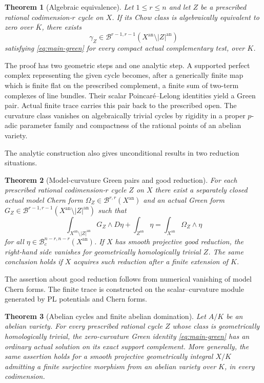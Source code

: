 \documentclass[11pt,reqno]{amsart}
\newtheorem{theorem}{Theorem}[section]
\theoremstyle{definition}
\theoremstyle{remark}
\numberwithin{equation}{section}
\newcommand{\an}{\mathrm{an}}
\newcommand{\B}{\mathcal B}
\begin{document}
\begin{theorem}[Algebraic equivalence]\label{thm:main-algebraic}
Let $1\le r\le n$ and let $Z$ be a prescribed rational
codimension-$r$ cycle on $X$.
If its Chow class is algebraically equivalent to zero over
$\overline K$, there exists
\[
\gamma_Z\in\B^{r-1,r-1}
       (X^{\an}\setminus |Z|^{\an})
\]
satisfying \eqref{eq:main-green} for every compact actual
complementary test, over $K$.
\end{theorem}

The proof has two geometric steps and one analytic step.
A supported perfect complex representing the given cycle becomes,
after a generically finite map which is finite flat on the prescribed
complement, a finite sum of two-term complexes of line bundles.
Their scalar Poincar\'e--Lelong identities yield a Green pair.
Actual finite trace carries this pair back to the prescribed open.
The curvature class vanishes on algebraically trivial cycles by
rigidity in a proper $p$-adic parameter family and compactness of
the rational points of an abelian variety.

The analytic construction also gives unconditional results in two
reduction situations.
\begin{theorem}[Model-curvature Green pairs and good reduction]
\label{thm:main-pairs}
For each prescribed rational codimension-$r$ cycle $Z$ on $X$
there exist a separately closed actual model Chern form
$\Omega_Z\in\B^{r,r}(X^{\an})$ and an actual Green form
$G_Z\in\B^{r-1,r-1}(X^{\an}\setminus|Z|^{\an})$ such that
\begin{equation}\label{eq:main-pair}
\int_{X^{\an}\setminus|Z|^{\an}}G_Z\wedge D\eta+
\int_{Z^{\an}}\eta
=\int_{X^{\an}}\Omega_Z\wedge\eta
\end{equation}
for all $\eta\in\B_c^{n-r,n-r}(X^{\an})$.
If $X$ has smooth projective good reduction, the right-hand side
vanishes for geometrically homologically trivial $Z$.
The same conclusion holds if $X$ acquires such reduction after
a finite extension of $K$.
\end{theorem}

The assertion about good reduction follows from numerical vanishing
of model Chern forms.  The finite trace is constructed on the
scalar--curvature module generated by PL potentials and Chern forms.

\begin{theorem}[Abelian cycles and finite abelian domination]
\label{thm:main-abelian}
Let $A/K$ be an abelian variety.  For every prescribed rational
cycle $Z$ whose class is geometrically homologically trivial,
the zero-curvature Green identity \eqref{eq:main-green} has an
ordinary actual solution on its exact support complement.
More generally, the same assertion holds for a smooth projective
geometrically integral $X/K$ admitting a finite surjective
morphism from an abelian variety over $K$, in every codimension.
\end{theorem}
\end{document}
